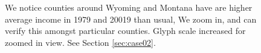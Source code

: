 \begin{figure}[t]
\caption{We notice counties around Wyoming and Montana have are higher average income in 1979 and 20019 than usual, We zoom in, and can verify this amongst particular counties. Glyph scale increased for zoomed in view. See Section \ref{sec:case02}.} \label{fig:case02}
\end{figure}
